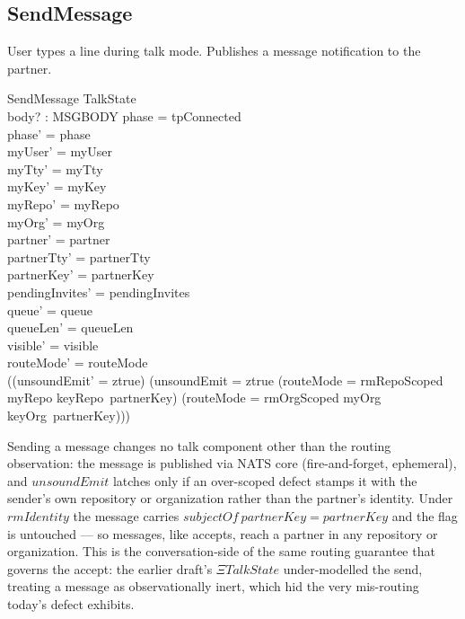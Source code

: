 \documentclass[a4paper,10pt,fleqn]{article}
\begin{document}
\subsection{SendMessage}

User types a line during talk mode.  Publishes a message
notification to the partner.

\begin{schema}{SendMessage}
  \Delta TalkState \\
  body? : MSGBODY
\where
  phase = tpConnected \\
  phase' = phase \\
  myUser' = myUser \\
  myTty' = myTty \\
  myKey' = myKey \\
  myRepo' = myRepo \\
  myOrg' = myOrg \\
  partner' = partner \\
  partnerTty' = partnerTty \\
  partnerKey' = partnerKey \\
  pendingInvites' = pendingInvites \\
  queue' = queue \\
  queueLen' = queueLen \\
  visible' = visible \\
  routeMode' = routeMode \\
  ((unsoundEmit' = ztrue) \iff
    (unsoundEmit = ztrue \lor
      (routeMode = rmRepoScoped \land myRepo \neq keyRepo~partnerKey) \lor
      (routeMode = rmOrgScoped \land myOrg \neq keyOrg~partnerKey)))
\end{schema}

Sending a message changes no talk component other than the routing
observation: the message is published via NATS core (fire-and-forget,
ephemeral), and $unsoundEmit$ latches only if an over-scoped defect
stamps it with the sender's own repository or organization rather than
the partner's identity.  Under $rmIdentity$ the message carries
$subjectOf~partnerKey = partnerKey$ and the flag is untouched --- so
messages, like accepts, reach a partner in any repository or
organization.  This is the conversation-side of the same routing
guarantee that governs the accept: the earlier draft's $\Xi TalkState$
under-modelled the send, treating a message as observationally inert,
which hid the very mis-routing today's defect exhibits.
\end{document}
